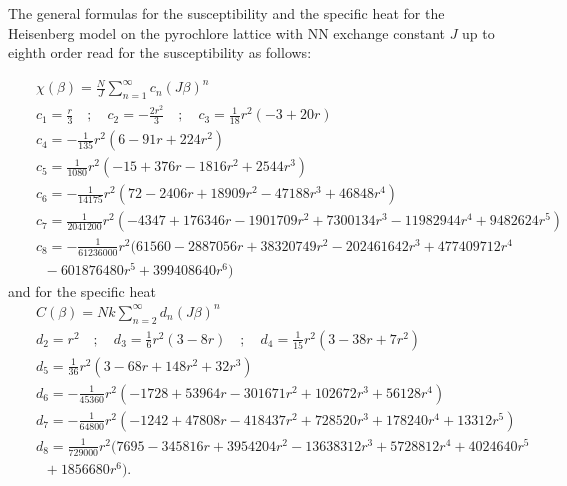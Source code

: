 \documentclass[aps,twocolumn,groupedaddress]{revtex4}
\begin{document}
The general formulas for the  susceptibility and the specific heat for the
Heisenberg
model on the pyrochlore lattice with NN exchange constant $J$
up to eighth order read for the susceptibility as follows:
\begin{widetext}
\begin{eqnarray}  \label{HTE_chi_pyro}
&&\chi(\beta)=\frac{N}{J}\sum_{n=1}^\infty c_n (J \beta )^n\\
&&c_1=\frac{r}{3} \quad ; \quad c_2=-\frac{2r^2}{3} \quad ; \quad c_3=\frac{1}{18}r^2(-3+20r)\nonumber\\
&&c_4=-\frac{1}{135}r^2(6-91r+224r^2)\nonumber\\
&&c_5=\frac{1}{1080}r^2(-15+376r-1816r^2+2544r^3)\nonumber\\
&&c_6=-\frac{1}{14175}r^2(72-2406r+18909r^2-47188r^3+46848r^4)\nonumber\\
&&c_7=\frac{1}{2041200}r^2(-4347+176346r-1901709r^2+7300134r^3-11982944r^4+9482624r^5)\nonumber\\
&&c_8=-\frac{1}{61236000}r^2(61560-2887056r+38320749r^2-202461642r^3+477409712r^4\nonumber\\
&& \; \; -601876480r^5+399408640r^6)\nonumber
\end{eqnarray}
and for the specific heat
\begin{eqnarray}  \label{HTE_C_pyro}
&&C(\beta)=N k \sum_{n=2}^\infty d_n(J\beta)^n\\
&&d_2=r^2 \quad ; \quad d_3=\frac{1}{6}r^2(3-8r) \quad ; \quad d_4=\frac{1}{15}r^2(3-38r+7r^2)\nonumber\\
&&d_5=\frac{1}{36}r^2(3-68r+148r^2+32r^3)\nonumber\\
&&d_6=-\frac{1}{45360}r^2(-1728+53964r-301671r^2+102672r^3+56128r^4)\nonumber\\
&&d_7=-\frac{1}{64800}r^2(-1242+47808r-418437r^2+728520r^3+178240r^4+13312r^5)\nonumber\\
&&d_8=\frac{1}{729000}r^2(7695-345816r+3954204r^2-13638312r^3+5728812r^4+4024640r^5\nonumber\\
&& \; \; +1856680r^6).\nonumber
\end{eqnarray}
\end{widetext}
\end{document}
